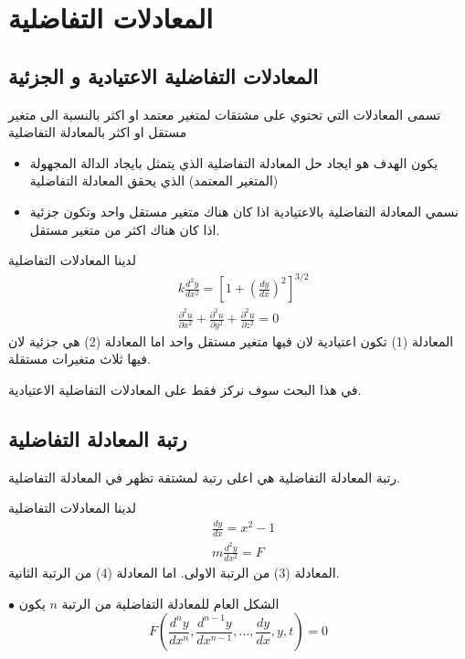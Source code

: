 \chapter{المعادلات التفاضلية}

\section{المعادلات التفاضلية الاعتيادية و الجزئية}
تسمى المعادلات التي تحتوي على مشتقات لمتغير معتمد او اكثر بالنسبة الى متغير مستقل او اكثر بالمعادلة التفاضلية 

\begin{itemize}
\item	يكون الهدف هو ايجاد حل المعادلة التفاضلية الذي يتمثل بايجاد الدالة المجهولة (المتغير المعتمد) الذي يحقق المعادلة التفاضلية

\item  نسمي المعادلة التفاضلية بالاعتيادية اذا كان هناك متغير مستقل واحد وتكون جزئية اذا كان هناك اكثر من متغير مستقل.
\end{itemize}

\begin{example}
	لدينا المعادلات التفاضلية
	\begin{align}
		&k \frac{d^2 y}{dx^2} = \left[1 + \left(\frac{dy}{dx}\right)^2\right]^{3/2}\\
		&\frac{\partial^2 u}{\partial x^2} + \frac{\partial^2 u}{\partial y^2} + \frac{\partial^2 u}{\partial z^2} = 0
	\end{align}
	المعادلة (1) تكون اعتيادية لان فيها متغير مستقل واحد اما المعادلة (2) هي جزئية لان فيها ثلاث متغيرات مستقلة.
\end{example}

في هذا البحث سوف نركز فقط على المعادلات التفاضلية الاعتيادية.

\section{رتبة المعادلة التفاضلية}
رتبة المعادلة التفاضلية هي اعلى رتبة لمشتقة تظهر في المعادلة التفاضلية.

\begin{example}
	لدينا المعادلات التفاضلية
	\begin{align}
		& \frac{dy}{dx} = x^2 -1\\
		& m \frac{d^2 y}{dx^2} = F
	\end{align}
	المعادلة (3) من الرتبة الاولى. اما المعادلة (4) من الرتبة الثانية.
\end{example} 
\noindent
$\bullet$ الشكل العام للمعادلة التفاضلية من الرتبة $n$ يكون
\[
F\left(\frac{d^n y}{dx^n}, \frac{d^{n-1} y}{dx^{n-1}}, \dots, \frac{dy}{dx}, y, t\right) = 0
\]

